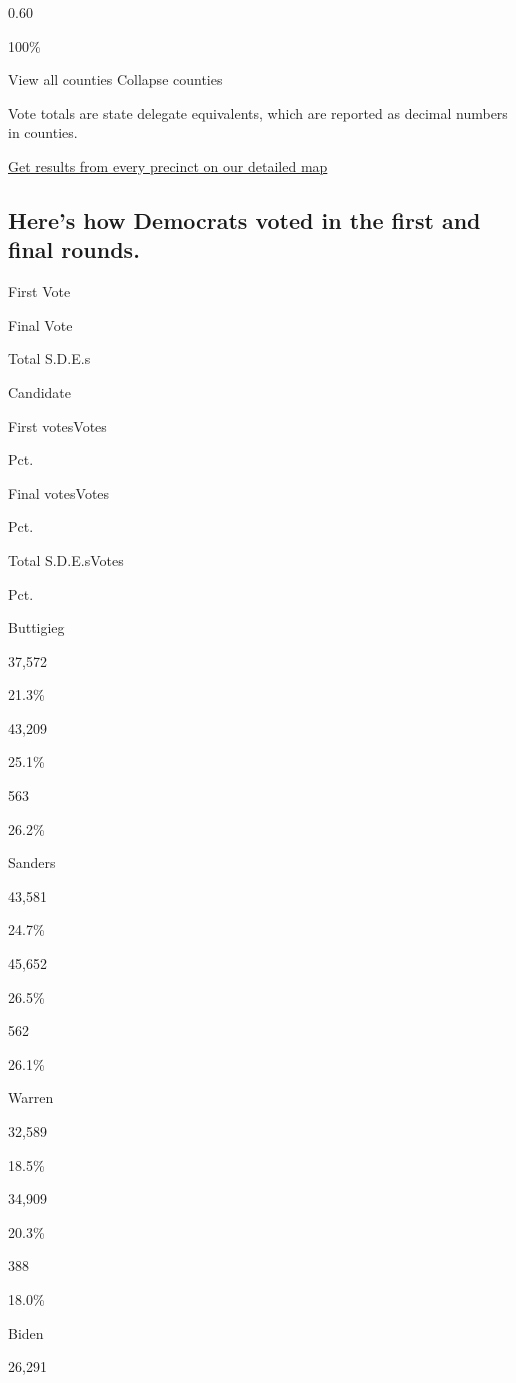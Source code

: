 0.60

100\%

View all counties Collapse counties

Vote totals are state delegate equivalents, which are reported as
decimal numbers in counties.

\href{https://www.nytimes3xbfgragh.onion/interactive/2020/02/03/us/elections/results-iowa-caucus-precinct-map.html?action=click\&module=ELEX_results\&pgtype=Interactive\&region=Component}{Get
results from every precinct on our detailed map}

\hypertarget{heres-how-democrats-voted-in-the-first-and-final-rounds}{%
\subsection{Here's how Democrats voted in the first and final
rounds.}\label{heres-how-democrats-voted-in-the-first-and-final-rounds}}

First Vote

Final Vote

Total S.D.E.s

Candidate

First votesVotes

Pct.

Final votesVotes

Pct.

Total S.D.E.sVotes

Pct.

 Buttigieg

37,572

21.3\%

43,209

25.1\%

563

26.2\%

 Sanders

43,581

24.7\%

45,652

26.5\%

562

26.1\%

 Warren

32,589

18.5\%

34,909

20.3\%

388

18.0\%

 Biden

26,291

